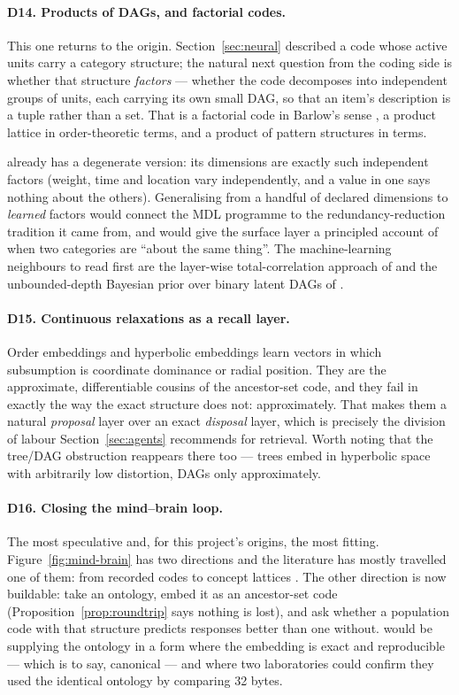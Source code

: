 \paragraph{D14. Products of DAGs, and factorial codes.} This one returns to
the origin. Section~\ref{sec:neural} described a code whose active units carry
a category structure; the natural next question from the coding side is
whether that structure \emph{factors} --- whether the code decomposes into
independent groups of units, each carrying its own small DAG, so that an
item's description is a tuple rather than a set. That is a factorial code in
Barlow's sense \citep{barlow1989}, a product lattice in order-theoretic terms,
and a product of pattern structures in \fca{} terms.

\odag{} already has a degenerate version: its dimensions are exactly such
independent factors (weight, time and location vary independently, and a value
in one says nothing about the others). Generalising from a handful of declared
dimensions to \emph{learned} factors would connect the MDL programme to the
redundancy-reduction tradition it came from, and would give the surface layer
a principled account of when two categories are ``about the same thing''.
The machine-learning neighbours to read first are the layer-wise
total-correlation approach of \citet{versteeg2014} and the unbounded-depth
Bayesian prior over binary latent DAGs of \citet{adams2010}.

\paragraph{D15. Continuous relaxations as a recall layer.} Order embeddings
\citep{vendrov2016} and hyperbolic embeddings \citep{nickel2017} learn vectors
in which subsumption is coordinate dominance or radial position. They are the
approximate, differentiable cousins of the ancestor-set code, and they fail in
exactly the way the exact structure does not: approximately. That makes them a
natural \emph{proposal} layer over an exact \emph{disposal} layer, which is
precisely the division of labour Section~\ref{sec:agents} recommends for
retrieval. Worth noting that the tree/DAG obstruction reappears there too ---
trees embed in hyperbolic space with arbitrarily low distortion, DAGs only
approximately.

\paragraph{D16. Closing the mind--brain loop.} The most speculative and, for
this project's origins, the most fitting. Figure~\ref{fig:mind-brain} has two
directions and the literature has mostly travelled one of them: from recorded
codes to concept lattices \citep{endres2008,endres2010}. The other direction
is now buildable: take an ontology, embed it as an ancestor-set code
(Proposition~\ref{prop:roundtrip} says nothing is lost), and ask whether a
population code with that structure predicts responses better than one
without. \odag{} would be supplying the ontology in a form where the embedding
is exact and reproducible --- which is to say, canonical --- and where two
laboratories could confirm they used the identical ontology by comparing 32
bytes.

